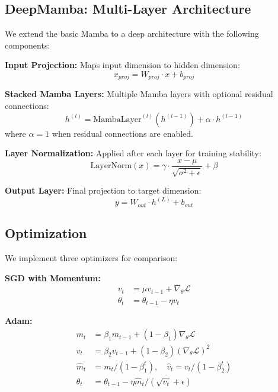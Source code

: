 \documentclass[11pt,a4paper]{article}
\begin{document}
\subsection{DeepMamba: Multi-Layer Architecture}

We extend the basic Mamba to a deep architecture with the following components:

\textbf{Input Projection:} Maps input dimension to hidden dimension:
\begin{equation}
    x_{proj} = W_{proj} \cdot x + b_{proj}
\end{equation}

\textbf{Stacked Mamba Layers:} Multiple Mamba layers with optional residual connections:
\begin{equation}
    h^{(l)} = \text{MambaLayer}^{(l)}(h^{(l-1)}) + \alpha \cdot h^{(l-1)}
\end{equation}
where $\alpha = 1$ when residual connections are enabled.

\textbf{Layer Normalization:} Applied after each layer for training stability:
\begin{equation}
    \text{LayerNorm}(x) = \gamma \cdot \frac{x - \mu}{\sqrt{\sigma^2 + \epsilon}} + \beta
\end{equation}

\textbf{Output Layer:} Final projection to target dimension:
\begin{equation}
    y = W_{out} \cdot h^{(L)} + b_{out}
\end{equation}

\subsection{Optimization}

We implement three optimizers for comparison:

\textbf{SGD with Momentum:}
\begin{align}
    v_t &= \mu v_{t-1} + \nabla_\theta \mathcal{L} \\
    \theta_t &= \theta_{t-1} - \eta v_t
\end{align}

\textbf{Adam:}
\begin{align}
    m_t &= \beta_1 m_{t-1} + (1-\beta_1) \nabla_\theta \mathcal{L} \\
    v_t &= \beta_2 v_{t-1} + (1-\beta_2) (\nabla_\theta \mathcal{L})^2 \\
    \hat{m}_t &= m_t / (1 - \beta_1^t), \quad \hat{v}_t = v_t / (1 - \beta_2^t) \\
    \theta_t &= \theta_{t-1} - \eta \hat{m}_t / (\sqrt{\hat{v}_t} + \epsilon)
\end{align}
\end{document}
